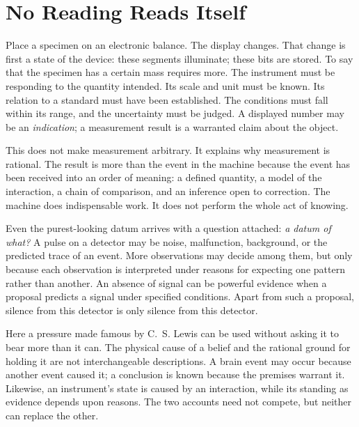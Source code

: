 \section{No Reading Reads Itself}

Place a specimen on an electronic balance. The display changes. That change is first a state of the device: these segments illuminate; these bits are stored. To say that the specimen has a certain mass requires more. The instrument must be responding to the quantity intended. Its scale and unit must be known. Its relation to a standard must have been established. The conditions must fall within its range, and the uncertainty must be judged. A displayed number may be an \emph{indication}; a measurement result is a warranted claim about the object.

This does not make measurement arbitrary. It explains why measurement is rational. The result is more than the event in the machine because the event has been received into an order of meaning: a defined quantity, a model of the interaction, a chain of comparison, and an inference open to correction. The machine does indispensable work. It does not perform the whole act of knowing.

Even the purest-looking datum arrives with a question attached: \emph{a datum of what?} A pulse on a detector may be noise, malfunction, background, or the predicted trace of an event. More observations may decide among them, but only because each observation is interpreted under reasons for expecting one pattern rather than another. An absence of signal can be powerful evidence when a proposal predicts a signal under specified conditions. Apart from such a proposal, silence from this detector is only silence from this detector.

Here a pressure made famous by C.~S. Lewis can be used without asking it to bear more than it can. The physical cause of a belief and the rational ground for holding it are not interchangeable descriptions. A brain event may occur because another event caused it; a conclusion is known because the premises warrant it. Likewise, an instrument's state is caused by an interaction, while its standing as evidence depends upon reasons. The two accounts need not compete, but neither can replace the other.

